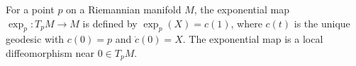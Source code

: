 For a point $p$ on a Riemannian manifold $M$, the exponential map $\exp_p: T_p M \to M$ is defined by $\exp_p(X) = c(1)$, where $c(t)$ is the unique geodesic with $c(0) = p$ and $\dot{c}(0) = X$. The exponential map is a local diffeomorphism near $0 \in T_p M$.